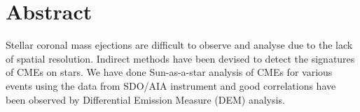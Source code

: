 \section{Abstract}

Stellar coronal mass ejections are difficult to observe and analyse due to the lack of spatial resolution. Indirect methods have been devised to detect the signatures of CMEs on stars. We have done Sun-as-a-star analysis of CMEs for various events using the data from SDO/AIA instrument and good correlations have been observed by Differential Emission Measure (DEM) analysis.

